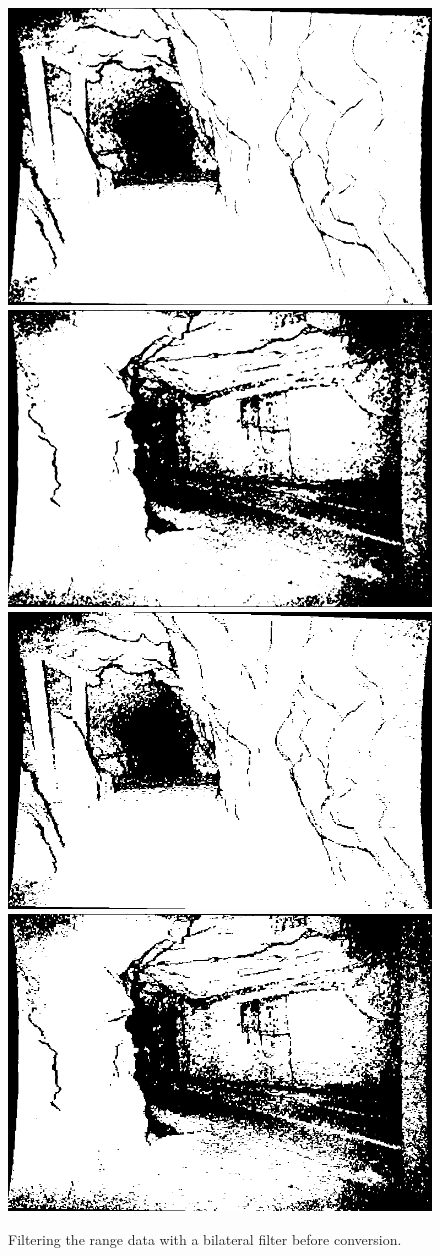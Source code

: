 \begin{figure}[H]
    \includegraphics[width=0.25\linewidth]{chapter06/results/conv_images/lehrpfad/flexion/bl/0000.png}%
    \includegraphics[width=0.25\linewidth]{chapter06/results/conv_images/lehrpfad/flexion/bl/0360.png}%
    \includegraphics[width=0.25\linewidth]{chapter06/results/conv_images/lehrpfad/bearing/bl/0000.png}%
    \includegraphics[width=0.25\linewidth]{chapter06/results/conv_images/lehrpfad/bearing/bl/0360.png}%
    \caption{Filtering the range data with a bilateral filter before conversion.}
\end{figure}

